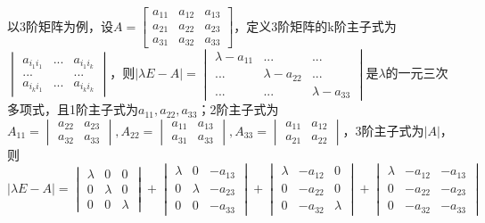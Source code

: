 以3阶矩阵为例，设\(A = \begin{bmatrix}
a_{11} & a_{12} & a_{13} \\ 
a_{21} & a_{22} & a_{23} \\ 
a_{31} & a_{32} & a_{33}
\end{bmatrix}\)，定义3阶矩阵的k阶主子式为\(\begin{vmatrix}
    a_{i_1i_1} & ... & a_{i_1i_k} \\ 
    ... & & ... \\ 
    a_{i_ki_1} & ... & a_{i_ki_k}
\end{vmatrix}\)，则\(|\lambda E - A| = \begin{vmatrix}
    \lambda - a_{11} & ... & ... \\ 
    ... & \lambda - a_{22} & ... \\ 
    ... & ... & \lambda - a_{33}
\end{vmatrix}\)是\(\lambda\)的一元三次多项式，且1阶主子式为\(a_{11}, a_{22}, a_{33}\)；2阶主子式为\(A_{11} = \begin{vmatrix}
    a_22 & a_23 \\ 
    a_32 & a_33
\end{vmatrix}, A_{22} = \begin{vmatrix}
    a_{11} & a_{13} \\ 
    a_{31} & a_{33}
\end{vmatrix}, A_{33} = \begin{vmatrix}
    a_{11} & a_{12} \\ 
    a_{21} & a_{22}
\end{vmatrix}\)，3阶主子式为\(|A|\)，则
\[|\lambda E - A| = 
\begin{vmatrix}
    \lambda & 0 & 0 \\ 
    0 & \lambda & 0 \\ 
    0 & 0 & \lambda
\end{vmatrix} + \begin{vmatrix}
    \lambda & 0 & -a_{13} \\ 
    0 & \lambda & -a_{23} \\ 
    0 & 0 & -a_{33}
\end{vmatrix} + \begin{vmatrix}
    \lambda & -a_{12} & 0 \\ 
    0 & -a_{22} & 0 \\ 
    0 & -a_{32} & \lambda
\end{vmatrix} + \begin{vmatrix}
    \lambda & -a_{12} & -a_{13} \\ 
    0 & -a_{22} & -a_{23} \\ 
    0 & -a_{32} & -a_{33}
\end{vmatrix}\]
